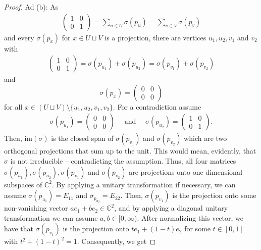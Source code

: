 \documentclass[a4paper]{amsart}
\newcommand{\C}{\mathbb{C}}
\begin{document}
\begin{proof}
    Ad (b):
    As
    \begin{align*}
        \begin{pmatrix}
            1 & 0 \\ 0 & 1
        \end{pmatrix}
        = \sum_{u \in U} \sigma(p_u) = \sum_{v \in V} \sigma(p_v)
    \end{align*}
    and every $\sigma(p_x)$ for $x \in U \sqcup V$ is a projection,
    there are vertices $u_1, u_2, v_1$ and $v_2$ with 
    \begin{align*}
        \begin{pmatrix}
            1 & 0 \\ 0 & 1
        \end{pmatrix}
        = \sigma(p_{u_1}) + \sigma(p_{u_2}) = \sigma(p_{v_1}) + \sigma(p_{v_2})
    \end{align*}
    and 
    $$ \sigma(p_x) = \begin{pmatrix}
        0 &0 \\ 0 &0
    \end{pmatrix} $$
    for all $x \in (U \sqcup V) \setminus \{u_1, u_2, v_1, v_2\}$. 
    For a contradiction assume
    \begin{align*}
        \sigma(p_{u_1}) = \begin{pmatrix}
            0 & 0 \\ 0 & 0
        \end{pmatrix}
        \quad \text{ and } \quad 
        \sigma(p_{u_2}) = \begin{pmatrix}
            1 & 0 \\ 0 & 1
        \end{pmatrix}.
    \end{align*}
    Then, $\mathrm{im}(\sigma)$ is the closed span of $\sigma(p_{v_1})$ and $\sigma(p_{v_2})$ which are two orthogonal projections that sum up to the unit. This would mean, evidently, that $\sigma$ is not irreducible -- contradicting the assumption. Thus, all four matrices $\sigma(p_{u_1}), \sigma(p_{u_2}), \sigma(p_{v_1})$ and $\sigma(p_{v_2})$ are projections onto one-dimensional subspaces of $\C^2$.
    By applying a unitary transformation if necessary, we can assume $\sigma(p_{u_1}) = E_{11}$ and $\sigma_{p_{u_2}} = E_{22}$. Then, $\sigma(p_{v_1})$ is the projection onto some non-vanishing vector $a e_1 + b e_2 \in \C^2$, and by applying a diagonal unitary transformation we can assume $a, b \in [0, \infty)$. After normalizing this vector, we have that $\sigma(p_{v_1})$ is the projection onto $t e_1 + (1-t) e_2$ for some $t \in [0,1]$ with $t^2 + (1-t)^2 = 1$. Consequently, we get

\end{proof}
\end{document}
